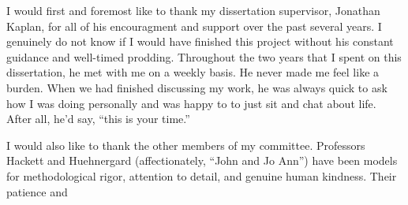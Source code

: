 
I would first and foremost like to thank my dissertation supervisor, Jonathan Kaplan, for all of his encouragment and support over the past several years. I genuinely do not know if I would have finished this project without his constant guidance and well-timed prodding. Throughout the two years that I spent on this dissertation, he met with me on a weekly basis. He never made me feel like a burden. When we had finished discussing my work, he was always quick to ask how I was doing personally and was happy to to just sit and chat about life. After all, he'd say, ``this is your time.''

I would also like to thank the other members of my committee. Professors Hackett and Huehnergard (affectionately, ``John and Jo Ann'') have been models for methodological rigor, attention to detail, and genuine human kindness. Their patience and 













